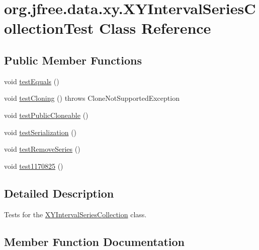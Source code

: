 \hypertarget{classorg_1_1jfree_1_1data_1_1xy_1_1_x_y_interval_series_collection_test}{}\section{org.\+jfree.\+data.\+xy.\+X\+Y\+Interval\+Series\+Collection\+Test Class Reference}
\label{classorg_1_1jfree_1_1data_1_1xy_1_1_x_y_interval_series_collection_test}
\subsection*{Public Member Functions}
\begin{DoxyCompactItemize}
\item 
void \mbox{\hyperlink{classorg_1_1jfree_1_1data_1_1xy_1_1_x_y_interval_series_collection_test_a0f6f725026196fc5dfa7bbebbfcb89fb}{test\+Equals}} ()
\item 
void \mbox{\hyperlink{classorg_1_1jfree_1_1data_1_1xy_1_1_x_y_interval_series_collection_test_aa02c1ea05aa670c60f0f2da3f360ea4f}{test\+Cloning}} ()  throws Clone\+Not\+Supported\+Exception 
\item 
void \mbox{\hyperlink{classorg_1_1jfree_1_1data_1_1xy_1_1_x_y_interval_series_collection_test_aa8ef271fe44e94dcf3ff45117ad14dda}{test\+Public\+Cloneable}} ()
\item 
void \mbox{\hyperlink{classorg_1_1jfree_1_1data_1_1xy_1_1_x_y_interval_series_collection_test_ae8ba2f3252faf1992c4b0367373727f5}{test\+Serialization}} ()
\item 
void \mbox{\hyperlink{classorg_1_1jfree_1_1data_1_1xy_1_1_x_y_interval_series_collection_test_a03e6f4abb646d8e4f8d7033bf827fa3c}{test\+Remove\+Series}} ()
\item 
void \mbox{\hyperlink{classorg_1_1jfree_1_1data_1_1xy_1_1_x_y_interval_series_collection_test_a8460bd20035b0468e393eb657d8c9869}{test1170825}} ()
\end{DoxyCompactItemize}


\subsection{Detailed Description}
Tests for the \mbox{\hyperlink{classorg_1_1jfree_1_1data_1_1xy_1_1_x_y_interval_series_collection}{X\+Y\+Interval\+Series\+Collection}} class. 

\subsection{Member Function Documentation}
\mbox{\label{classorg_1_1jfree_1_1data_1_1xy_1_1_x_y_interval_series_collection_test_a8460bd20035b0468e393eb657d8c9869}} 

